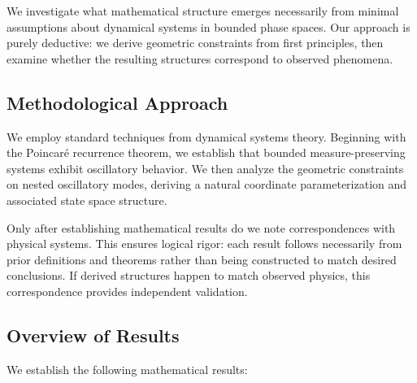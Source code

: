 \documentclass[11pt,a4paper]{article}
\theoremstyle{remark}
\begin{document}
We investigate what mathematical structure emerges necessarily from minimal assumptions about dynamical systems in bounded phase spaces. Our approach is purely deductive: we derive geometric constraints from first principles, then examine whether the resulting structures correspond to observed phenomena.

\subsection{Methodological Approach}

We employ standard techniques from dynamical systems theory. Beginning with the Poincar\'{e} recurrence theorem, we establish that bounded measure-preserving systems exhibit oscillatory behavior. We then analyze the geometric constraints on nested oscillatory modes, deriving a natural coordinate parameterization and associated state space structure.

Only after establishing mathematical results do we note correspondences with physical systems. This ensures logical rigor: each result follows necessarily from prior definitions and theorems rather than being constructed to match desired conclusions. If derived structures happen to match observed physics, this correspondence provides independent validation.

\subsection{Overview of Results}

We establish the following mathematical results:
\end{document}
